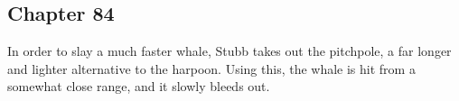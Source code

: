 \subsection{Chapter 84}

In order to slay a much faster whale, Stubb takes out the pitchpole, a far
longer and lighter alternative to the harpoon. Using this, the whale is hit
from a somewhat close range, and it slowly bleeds out.
